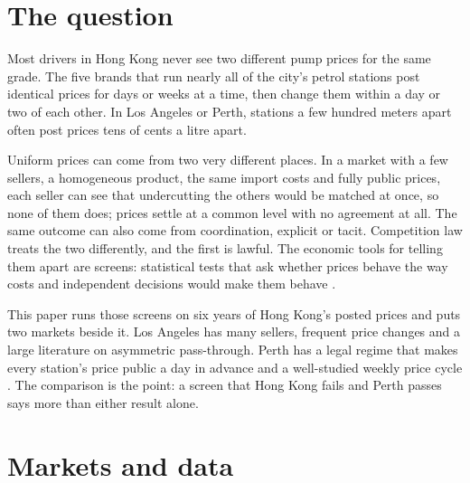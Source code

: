 \documentclass[11pt]{article}
\begin{document}
\clearpage
\section{The question}

Most drivers in Hong Kong never see two different pump prices for the same grade. The five brands that run nearly all of the city's petrol stations post identical prices for days or weeks at a time, then change them within a day or two of each other. In Los Angeles or Perth, stations a few hundred meters apart often post prices tens of cents a litre apart.

Uniform prices can come from two very different places. In a market with a few sellers, a homogeneous product, the same import costs and fully public prices, each seller can see that undercutting the others would be matched at once, so none of them does; prices settle at a common level with no agreement at all. The same outcome can also come from coordination, explicit or tacit. Competition law treats the two differently, and the first is lawful. The economic tools for telling them apart are screens: statistical tests that ask whether prices behave the way costs and independent decisions would make them behave \parencite{harrington2008}.

This paper runs those screens on six years of Hong Kong's posted prices and puts two markets beside it. Los Angeles has many sellers, frequent price changes and a large literature on asymmetric pass-through. Perth has a legal regime that makes every station's price public a day in advance and a well-studied weekly price cycle \parencite{wang2009,byrne2019}. The comparison is the point: a screen that Hong Kong fails and Perth passes says more than either result alone.

\section{Markets and data}
\end{document}
